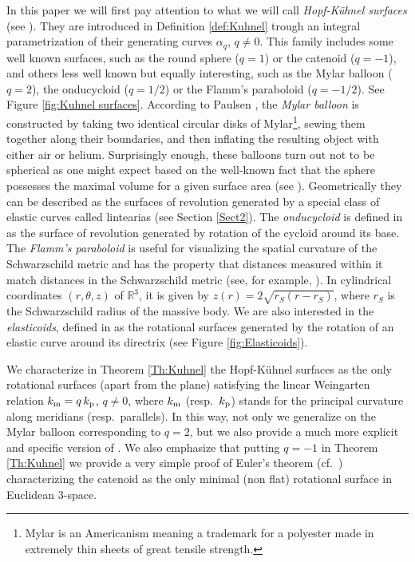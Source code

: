 \documentclass[leqno,11pt]{amsart}
\def\R{\mathbb{R}}
\theoremstyle{definition}
\numberwithin{equation}{section}
\begin{document}
In this paper we will first pay attention to what we will call \textit{Hopf-Kühnel surfaces} (see \cite{K15}). They are introduced in Definition \ref{def:Kuhnel} trough an integral parametrization of their generating curves $\alpha_q$, $q\neq 0$. This family includes some well known surfaces, such as the round sphere ($q=1$) or the catenoid ($q=-1$), and others less well known but equally interesting, such as the Mylar balloon ($q=2$), the onducycloid ($q=1/2$) or the Flamm's paraboloid ($q=-1/2$). See Figure \ref{fig:Kuhnel surfaces}.
According to Paulsen \cite{P94}, the \textit{Mylar balloon} is constructed by taking two identical circular
disks of Mylar\footnote{Mylar is an Americanism meaning a trademark for a polyester made in extremely thin sheets of great tensile strength.}, sewing them together along their boundaries, and then inflating the resulting
object with either air or helium. Surprisingly enough, these balloons turn out not to be
spherical as one might expect based on the well-known fact that the sphere possesses
the maximal volume for a given surface area (see \cite{MO03}).
Geometrically they can be described as the surfaces of revolution generated by a special class of elastic curves called lintearias (see Section \ref{Sect2}). The \textit{onducycloid} is defined in \cite{CC22} as the surface of revolution generated by rotation of the cycloid around its base.
The \textit{Flamm's paraboloid} is useful for visualizing the spatial curvature of the Schwarzschild metric and has the property that distances measured within it match distances in the Schwarzschild metric (see, for example, \cite{Kr60}). 
In cylindrical coordinates $(r,\theta,z)$ of $\R^3$, it is given by $z(r)=2\sqrt{r_S(r-r_S)}$, where $r_S$  is the Schwarzschild radius of the massive body.
We are also interested in the \textit{elasticoids}, defined in \cite[Section 3.5]{CC22} as the rotational surfaces generated by the rotation of an elastic curve around its directrix (see Figure \ref{fig:Elasticoids}). 

We characterize in Theorem \ref{Th:Kuhnel} the Hopf-Kühnel surfaces as the only rotational surfaces (apart from the plane) satisfying the linear Weingarten relation $k_{\text m}=q\, k_{\text p}$, $q\neq0$, where $k_{\text m}$ (resp.\ $k_{\text p}$) stands for the principal curvature along meridians (resp.\ parallels).
In this way, not only we generalize \cite[Theorem 6.5]{MO03} on the Mylar balloon corresponding to $q=2$, but we also provide a much more explicit and specific version of \cite[Theorem 3.2]{LP20}. We also emphasize that putting $q=-1$ in Theorem \ref{Th:Kuhnel} we provide a very simple proof of Euler's theorem (cf.\ \cite{E44}) characterizing the catenoid as the only minimal (non flat) rotational surface in Euclidean 3-space.
\end{document}

